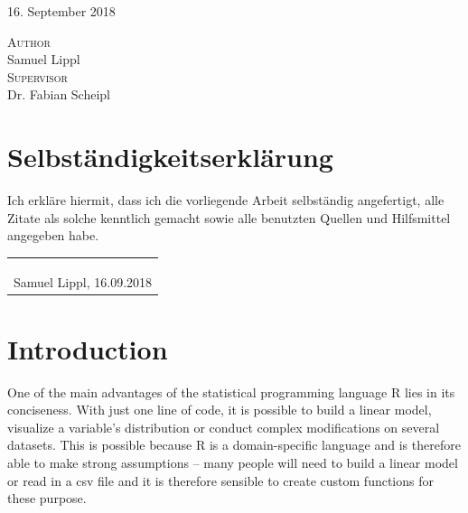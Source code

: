 \documentclass[]{report}
\theoremstyle{definition}
\theoremstyle{definition}
\theoremstyle{definition}
\theoremstyle{remark}
\begin{document}
\begin{titlepage}

\vfill


{\Large 16. September 2018}\\[1cm]
\begin{Large}
\textsc{Author}\\Samuel Lippl\\[1cm]
\textsc{Supervisor}\\
Dr. Fabian Scheipl
\end{Large}

\vfill

\end{titlepage}

\setcounter{page}{2}

\chapter*{Selbständigkeitserklärung}

Ich erkläre hiermit, dass ich die vorliegende Arbeit selbständig angefertigt, alle Zitate als solche kenntlich gemacht sowie alle benutzten Quellen und Hilfsmittel angegeben habe.\\

\begin{tabular}{c}
\\\\\\
\\\hline
Samuel Lippl, 16.09.2018
\end{tabular}

\tableofcontents

\chapter{Introduction}\label{intro}

 \setcounter{page}{1}

One of the main advantages of the statistical programming language R
\citep{R} lies in its conciseness. With just one line of code, it is
possible to build a linear model, visualize a variable's distribution or
conduct complex modifications on several datasets. This is possible
because R is a domain-specific language and is therefore able to make
strong assumptions -- many people will need to build a linear model or
read in a csv file and it is therefore sensible to create custom
functions for these purpose.
\end{document}
